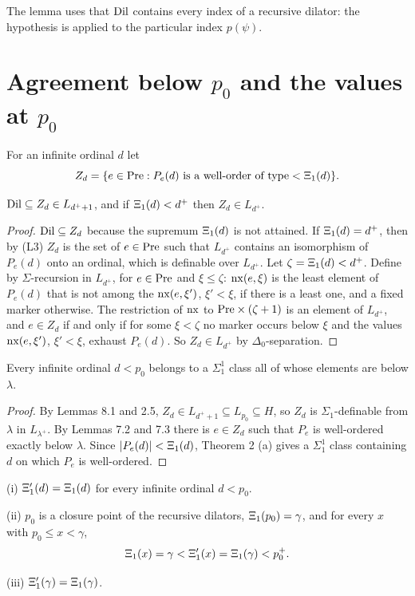 \documentclass[11pt]{article}
\begin{document}
The lemma uses that $\mathrm{Dil}$ contains every index of a recursive dilator: the hypothesis is applied to the particular
index $p(\psi)$.

\section{Agreement below $p_0$ and the values at $p_0$}

For an infinite ordinal $d$ let
\[ Z_d = \{e \in \mathrm{Pre} : P_e(d) \text{ is a well-order of type} < \Xi_1(d)\} . \]

\begin{statement} $\mathrm{Dil} \subseteq Z_d \in L_{d^+ + 1}$, and if $\Xi_1(d) < d^+$ then
$Z_d \in L_{d^+}$.
\end{statement}

\begin{proof} $\mathrm{Dil} \subseteq Z_d$ because the supremum $\Xi_1(d)$ is not attained. If $\Xi_1(d) = d^+$, then by (L3)
$Z_d$ is the set of $e \in \mathrm{Pre}$ such that $L_{d^+}$ contains an isomorphism of $P_e(d)$ onto an ordinal, which is
definable over $L_{d^+}$. Let $\zeta = \Xi_1(d) < d^+$. Define by $\Sigma$-recursion in $L_{d^+}$, for $e \in \mathrm{Pre}$
and $\xi \le \zeta$: $\operatorname{nx}(e, \xi)$ is the least element of $P_e(d)$ that is not among the $\operatorname{nx}(e, \xi')$, $\xi' < \xi$,
if there is a least one, and a fixed marker otherwise. The restriction of $\operatorname{nx}$ to $\mathrm{Pre} \times (\zeta + 1)$ is an
element of $L_{d^+}$, and $e \in Z_d$ if and only if for some $\xi < \zeta$ no marker occurs below $\xi$ and the
values $\operatorname{nx}(e, \xi')$, $\xi' < \xi$, exhaust $P_e(d)$. So $Z_d \in L_{d^+}$ by $\Delta_0$-separation.
\end{proof}

\begin{statement} Every infinite ordinal $d < p_0$ belongs to a $\Sigma^1_1$ class all of whose
elements are below $\lambda$.
\end{statement}

\begin{proof} By Lemmas 8.1 and 2.5, $Z_d \in L_{d^+ + 1} \subseteq L_{p_0} \subseteq H$, so $Z_d$ is
$\Sigma_1$-definable from $\lambda$ in $L_{\lambda^+}$. By Lemmas 7.2 and 7.3 there is $e \in Z_d$ such that $P_e$ is
well-ordered exactly below $\lambda$. Since $|P_e(d)| < \Xi_1(d)$, Theorem 2 (a) gives a $\Sigma^1_1$ class containing $d$
on which $P_e$ is well-ordered.
\end{proof}

\begin{statement} (i) $\Xi'_1(d) = \Xi_1(d)$ for every infinite ordinal $d < p_0$.

(ii) $p_0$ is a closure point of the recursive dilators, $\Xi_1(p_0) = \gamma$, and for every $x$ with
$p_0 \le x < \gamma$,
\[ \Xi_1(x) = \gamma < \Xi'_1(x) = \Xi_1(\gamma) < p_0^+ . \]

(iii) $\Xi'_1(\gamma) = \Xi_1(\gamma)$.
\end{statement}
\end{document}
